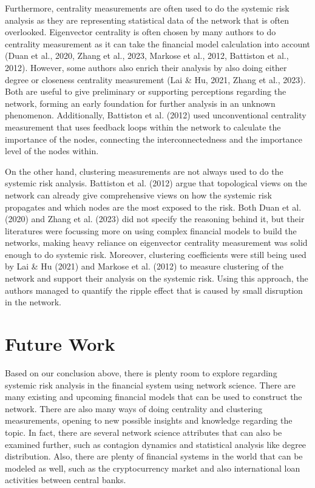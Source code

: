 \documentclass[a4paper,11pt]{article}
\begin{document}
Furthermore, centrality measurements are often used to do the systemic risk analysis as they are representing statistical data of the network that is often overlooked. Eigenvector centrality is often chosen by many authors to do centrality measurement as it can take the financial model calculation into account (Duan et al., 2020, Zhang et al., 2023, Markose et al., 2012, Battiston et al., 2012). However, some authors also enrich their analysis by also doing either degree or closeness centrality measurement (Lai \& Hu, 2021, Zhang et al., 2023). Both are useful to give preliminary or supporting perceptions regarding the network, forming an early foundation for further analysis in an unknown phenomenon. Additionally, Battiston et al. (2012) used unconventional centrality measurement that uses feedback loops within the network to calculate the importance of the nodes, connecting the interconnectedness and the importance level of the nodes within. 

On the other hand, clustering measurements are not always used to do the systemic risk analysis. Battiston et al. (2012) argue that topological views on the network can already give comprehensive views on how the systemic risk propagates and which nodes are the most exposed to the risk. Both Duan et al. (2020) and Zhang et al. (2023) did not specify the reasoning behind it, but their literatures were focussing more on using complex financial models to build the networks, making heavy reliance on eigenvector centrality measurement was solid enough to do systemic risk. Moreover, clustering coefficients were still being used by Lai \& Hu (2021) and Markose et al. (2012) to measure clustering of the network and support their analysis on the systemic risk. Using this approach, the authors managed to quantify the ripple effect that is caused by small disruption in the network.

\section{Future Work}
Based on our conclusion above, there is plenty room to explore regarding systemic risk analysis in the financial system using network science. There are many existing and upcoming financial models that can be used to construct the network. There are also many ways of doing centrality and clustering measurements, opening to new possible insights and knowledge regarding the topic. In fact, there are several network science attributes that can also be examined further, such as contagion dynamics and statistical analysis like degree distribution. Also, there are plenty of financial systems in the world that can be modeled as well, such as the cryptocurrency market and also international loan activities between central banks.
\end{document}
